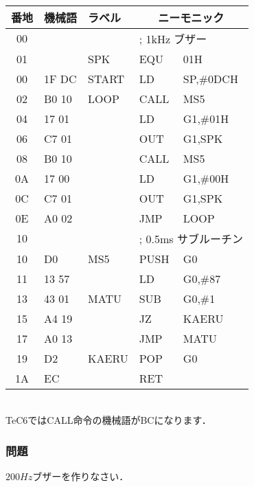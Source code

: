 {\begin{center}
{{\begin{center}
{\footnotesize\tt
\begin{tabular}{|c|l|l| l l|} \hline
番地 & 機械語 & ラベル & \multicolumn{2}{c|}{ニーモニック} \\
\hline
00 &          &        &\multicolumn{2}{|l|}{; 1kHz ブザー} \\
01 &          & SPK    & EQU &    01H              \\
00 & 1F DC    & START  & LD  &    SP,\#0DCH        \\
02 & B0 10    & LOOP   & CALL&    MS5              \\
04 & 17 01    &        & LD  &    G1,\#01H         \\
06 & C7 01    &        & OUT &    G1,SPK           \\
08 & B0 10    &        & CALL&    MS5              \\
0A & 17 00    &        & LD  &    G1,\#00H         \\
0C & C7 01    &        & OUT &    G1,SPK           \\
0E & A0 02    &        & JMP &    LOOP             \\
10 &          &        &\multicolumn{2}{|l|}{; 0.5ms サブルーチン} \\
10 & D0       & MS5    & PUSH&    G0               \\
11 & 13 57    &        & LD  &    G0,\#87          \\
13 & 43 01    & MATU   & SUB &    G0,\#1           \\
15 & A4 19    &        & JZ  &    KAERU            \\
17 & A0 13    &        & JMP &    MATU             \\
19 & D2       & KAERU  & POP &    G0               \\
1A & EC       &        & RET &                     \\
\hline
\end{tabular}
\\TeC6ではCALL命令の機械語がBCになります．
}
\end{center}
}}
\end{center}
}

\subsubsection{問題}
 $200Hz$ブザーを作りなさい．

